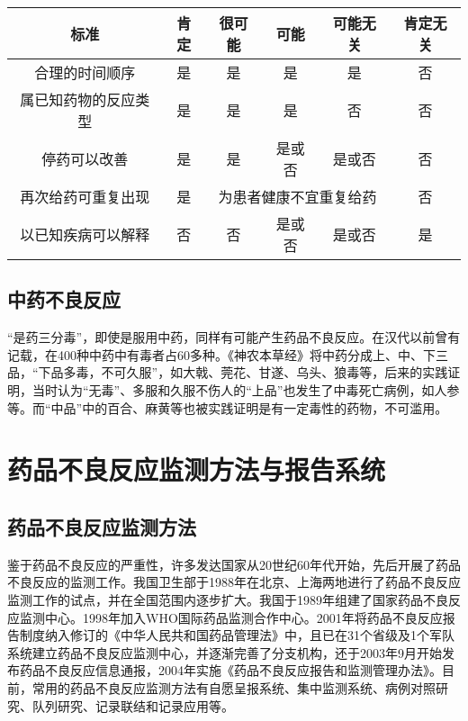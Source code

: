 \begin{table}[ht]
    \caption{药品不良反应判断标准表}
    \label{tab3-2}
    \centering
    \begin{longtable}{cccccc}
    \toprule
    标准 & 肯定 & 很可能 & 可能 & 可能无关 & 肯定无关\\
    \midrule
    合理的时间顺序 & 是 & 是 & 是 & 是 & 否\\
    属已知药物的反应类型 & 是 & 是 & 是 & 否 & 否\\
    停药可以改善 & 是 & 是 & 是或否 & 是或否 & 否\\
    再次给药可重复出现 & 是 & \multicolumn{3}{c}{为患者健康不宜重复给药} & 否 \\
    以已知疾病可以解释 & 否 & 否 & 是或否 & 是或否 & 是\\
    \bottomrule
    \end{longtable}
\end{table}

\subsection{中药不良反应}

“是药三分毒”，即使是服用中药，同样有可能产生药品不良反应。在汉代以前曾有记载，在400种中药中有毒者占60多种。《神农本草经》将中药分成上、中、下三品，“下品多毒，不可久服”，如大戟、莞花、甘遂、乌头、狼毒等，后来的实践证明，当时认为“无毒”、多服和久服不伤人的“上品”也发生了中毒死亡病例，如人参等。而“中品”中的百合、麻黄等也被实践证明是有一定毒性的药物，不可滥用。

\section{药品不良反应监测方法与报告系统}

\subsection{药品不良反应监测方法}

鉴于药品不良反应的严重性，许多发达国家从20世纪60年代开始，先后开展了药品不良反应的监测工作。我国卫生部于1988年在北京、上海两地进行了药品不良反应监测工作的试点，并在全国范围内逐步扩大。我国于1989年组建了国家药品不良反应监测中心。1998年加入WHO国际药品监测合作中心。2001年将药品不良反应报告制度纳入修订的《中华人民共和国药品管理法》中，且已在31个省级及1个军队系统建立药品不良反应监测中心，并逐渐完善了分支机构，还于2003年9月开始发布药品不良反应信息通报，2004年实施《药品不良反应报告和监测管理办法》。目前，常用的药品不良反应监测方法有自愿呈报系统、集中监测系统、病例对照研究、队列研究、记录联结和记录应用等。

